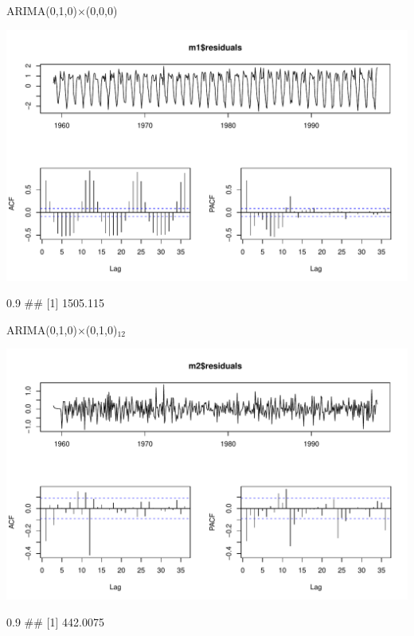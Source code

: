 \documentclass[11pt,ignorenonframetext,]{beamer}
\let\oldverbatim\verbatim
\let\endoldverbatim\endverbatim
\renewenvironment{verbatim}{\footnotesize\begin{spacing}{0.9}\oldverbatim}{\endoldverbatim\end{spacing}}
\begin{document}
\begin{frame}[fragile]{ARIMA(0,1,0)\(\times\)(0,0,0)}

\includegraphics{Lec15_files/figure-beamer/unnamed-chunk-3-1.pdf}

\begin{verbatim}
## [1] 1505.115
\end{verbatim}

\end{frame}

\begin{frame}[fragile]{ARIMA(0,1,0)\(\times\)(0,1,0)\(_{12}\)}

\includegraphics{Lec15_files/figure-beamer/unnamed-chunk-4-1.pdf}

\begin{verbatim}
## [1] 442.0075
\end{verbatim}

\end{frame}
\end{document}
